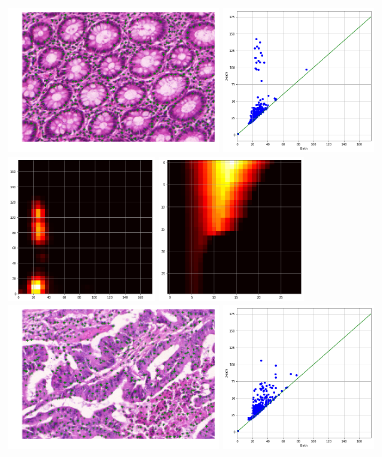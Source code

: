 \documentclass{article}
\begin{document}
%
\begin{figure}[t]
\centering
\includegraphics[height=1.5in]{figures/train_22_nuclei.png}
\includegraphics[height=1.5in]{figures/train_22_pd_bd.png}
\includegraphics[height=1.5in]{figures/train_22_pi.png}
\includegraphics[height=1.5in]{figures/train_22_pl.png}\\
\includegraphics[height=1.5in]{figures/train_11_nuclei.png}
\includegraphics[height=1.5in]{figures/train_11_pd_bd.png}

\end{figure}
\end{document}
